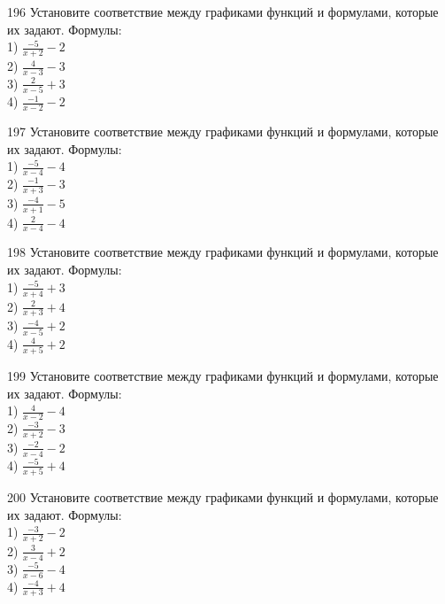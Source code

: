 \documentclass[4apaper]{article}
\begin{document}
\begin{taskBN}{196}
Установите соответствие между графиками функций и формулами, которые их задают. Формулы: \\1) $\frac{-5}{x+2}-2$\\2) $\frac{4}{x-3}-3$\\3) $\frac{2}{x-5}+3$\\4) $\frac{-1}{x-2}-2$
\end{taskBN}

\begin{taskBN}{197}
Установите соответствие между графиками функций и формулами, которые их задают. Формулы: \\1) $\frac{-5}{x-4}-4$\\2) $\frac{-1}{x+3}-3$\\3) $\frac{-4}{x+1}-5$\\4) $\frac{2}{x-4}-4$
\end{taskBN}

\begin{taskBN}{198}
Установите соответствие между графиками функций и формулами, которые их задают. Формулы: \\1) $\frac{-5}{x+4}+3$\\2) $\frac{2}{x+3}+4$\\3) $\frac{-4}{x-5}+2$\\4) $\frac{4}{x+5}+2$
\end{taskBN}

\begin{taskBN}{199}
Установите соответствие между графиками функций и формулами, которые их задают. Формулы: \\1) $\frac{4}{x-2}-4$\\2) $\frac{-3}{x+2}-3$\\3) $\frac{-2}{x-4}-2$\\4) $\frac{-5}{x+5}+4$
\end{taskBN}

\begin{taskBN}{200}
Установите соответствие между графиками функций и формулами, которые их задают. Формулы: \\1) $\frac{-3}{x+2}-2$\\2) $\frac{3}{x-4}+2$\\3) $\frac{-5}{x-6}-4$\\4) $\frac{-4}{x+3}+4$
\end{taskBN}
\end{document}
